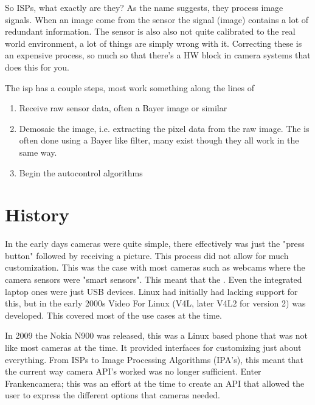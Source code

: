So ISPs, what exactly are they? As the name suggests, they process image signals.
When an image come from the sensor the signal (image) contains a lot of
redundant information. The sensor is also also not quite calibrated to the real
world environment, a lot of things are simply wrong with it. Correcting these
is an expensive process, so much so that there's a HW block in camera systems
that does this for you.

The isp has a couple steps, most work something along the lines of

\begin{enumerate}
    \item Receive raw sensor data, often a Bayer image or similar
    \item Demosaic the image, i.e. extracting the pixel data from the raw image.
          The is often done using a Bayer like filter, many exist though they
          all work in the same way.
    \item Begin the autocontrol algorithms


\end{enumerate}


\section{History}
In the early days cameras were quite simple, there effectively was just the
"press button" followed by receiving a picture. This process did not allow for
much customization. This was the case with most cameras such as webcams where
the camera sensors were "smart sensors". This meant that the . Even the
integrated laptop ones were just USB devices. Linux had initially had lacking
support for this, but in the early 2000s Video For Linux (V4L, later V4L2 for
version 2) was developed. This covered most of the use cases at the time.

In 2009 the Nokia N900 was released, this was a Linux based phone that was not
like most cameras at the time. It provided interfaces for customizing just
about everything. From ISPs to Image Processing Algorithms (IPA's), this meant
that the current way camera API's worked was no longer sufficient. Enter
Frankencamera\cite{adams2010frankencamera}; this was an effort at the time
to create an API that allowed the user to express the different options that
cameras needed.
